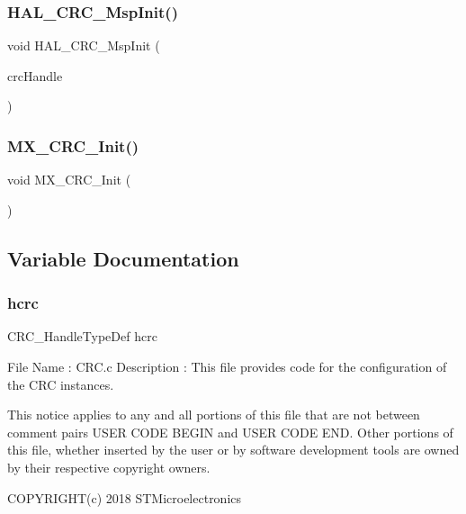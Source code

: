 \subsubsection{H\+A\+L\+\_\+\+C\+R\+C\+\_\+\+Msp\+Init()}
{\footnotesize\ttfamily void H\+A\+L\+\_\+\+C\+R\+C\+\_\+\+Msp\+Init (\begin{DoxyParamCaption}\item[{C\+R\+C\+\_\+\+Handle\+Type\+Def $\ast$}]{crc\+Handle }\end{DoxyParamCaption})}

\mbox{\label{crc_8c_a9f720fe95d685258cfe2ba29dc395c48}} 
\subsubsection{M\+X\+\_\+\+C\+R\+C\+\_\+\+Init()}
{\footnotesize\ttfamily void M\+X\+\_\+\+C\+R\+C\+\_\+\+Init (\begin{DoxyParamCaption}\item[{void}]{ }\end{DoxyParamCaption})}



\subsection{Variable Documentation}
\mbox{\label{crc_8c_ae3358c54a01c6487322df1275618d6b1}} 
\subsubsection{hcrc}
{\footnotesize\ttfamily C\+R\+C\+\_\+\+Handle\+Type\+Def hcrc}

File Name \+: C\+R\+C.\+c Description \+: This file provides code for the configuration of the C\+RC instances.

This notice applies to any and all portions of this file that are not between comment pairs U\+S\+ER C\+O\+DE B\+E\+G\+IN and U\+S\+ER C\+O\+DE E\+ND. Other portions of this file, whether inserted by the user or by software development tools are owned by their respective copyright owners.

C\+O\+P\+Y\+R\+I\+G\+H\+T(c) 2018 S\+T\+Microelectronics

